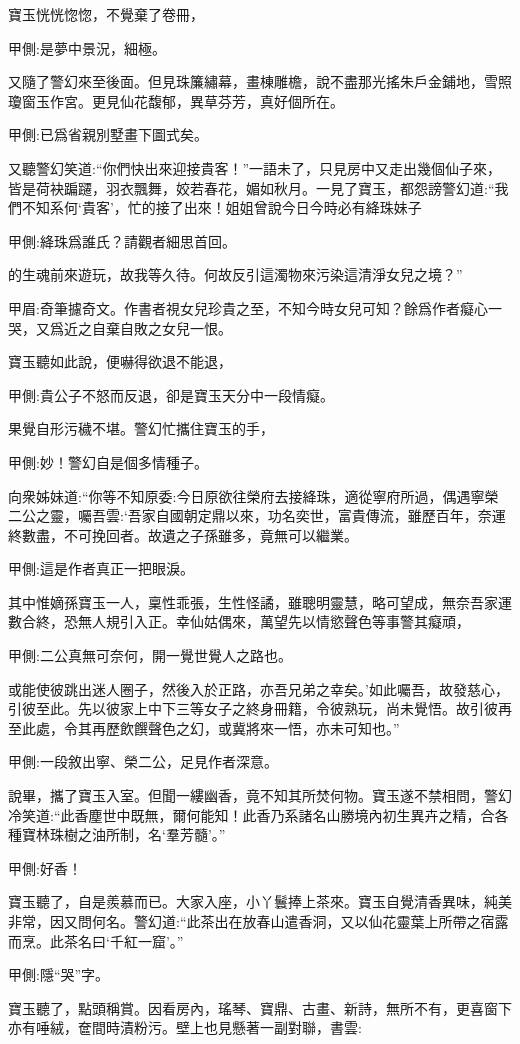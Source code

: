 \begin{parag}
    寶玉恍恍惚惚，不覺棄了卷冊，\begin{note}甲側:是夢中景況，細極。\end{note}又隨了警幻來至後面。但見珠簾繡幕，畫棟雕檐，說不盡那光搖朱戶金鋪地，雪照瓊窗玉作宮。更見仙花馥郁，異草芬芳，真好個所在。\begin{note}甲側:已爲省親別墅畫下圖式矣。\end{note}又聽警幻笑道:“你們快出來迎接貴客！”一語未了，只見房中又走出幾個仙子來，皆是荷袂蹁躚，羽衣飄舞，姣若春花，媚如秋月。一見了寶玉，都怨謗警幻道:“我們不知系何‘貴客’，忙的接了出來！姐姐曾說今日今時必有絳珠妹子\begin{note}甲側:絳珠爲誰氏？請觀者細思首回。\end{note}的生魂前來遊玩，故我等久待。何故反引這濁物來污染這清淨女兒之境？”\begin{note}甲眉:奇筆攄奇文。作書者視女兒珍貴之至，不知今時女兒可知？餘爲作者癡心一哭，又爲近之自棄自敗之女兒一恨。\end{note}寶玉聽如此說，便嚇得欲退不能退，\begin{note}甲側:貴公子不怒而反退，卻是寶玉天分中一段情癡。\end{note}果覺自形污穢不堪。警幻忙攜住寶玉的手，\begin{note}甲側:妙！警幻自是個多情種子。\end{note}向衆姊妹道:“你等不知原委:今日原欲往榮府去接絳珠，適從寧府所過，偶遇寧榮二公之靈，囑吾雲:‘吾家自國朝定鼎以來，功名奕世，富貴傳流，雖歷百年，奈運終數盡，不可挽回者。故遺之子孫雖多，竟無可以繼業。\begin{note}甲側:這是作者真正一把眼淚。\end{note}其中惟嫡孫寶玉一人，稟性乖張，生性怪譎，雖聰明靈慧，略可望成，無奈吾家運數合終，恐無人規引入正。幸仙姑偶來，萬望先以情慾聲色等事警其癡頑，\begin{note}甲側:二公真無可奈何，開一覺世覺人之路也。\end{note}或能使彼跳出迷人圈子，然後入於正路，亦吾兄弟之幸矣。’如此囑吾，故發慈心，引彼至此。先以彼家上中下三等女子之終身冊籍，令彼熟玩，尚未覺悟。故引彼再至此處，令其再歷飲饌聲色之幻，或冀將來一悟，亦未可知也。”\begin{note}甲側:一段敘出寧、榮二公，足見作者深意。\end{note}
\end{parag}


\begin{parag}
    說畢，攜了寶玉入室。但聞一縷幽香，竟不知其所焚何物。寶玉遂不禁相問，警幻冷笑道:“此香塵世中既無，爾何能知！此香乃系諸名山勝境內初生異卉之精，合各種寶林珠樹之油所制，名‘羣芳髓’。”\begin{note}甲側:好香！\end{note}寶玉聽了，自是羨慕而已。大家入座，小丫鬟捧上茶來。寶玉自覺清香異味，純美非常，因又問何名。警幻道:“此茶出在放春山遣香洞，又以仙花靈葉上所帶之宿露而烹。此茶名曰‘千紅一窟’。”\begin{note}甲側:隱“哭”字。\end{note}寶玉聽了，點頭稱賞。因看房內，瑤琴、寶鼎、古畫、新詩，無所不有，更喜窗下亦有唾絨，奩間時漬粉污。壁上也見懸著一副對聯，書雲:
\end{parag}


